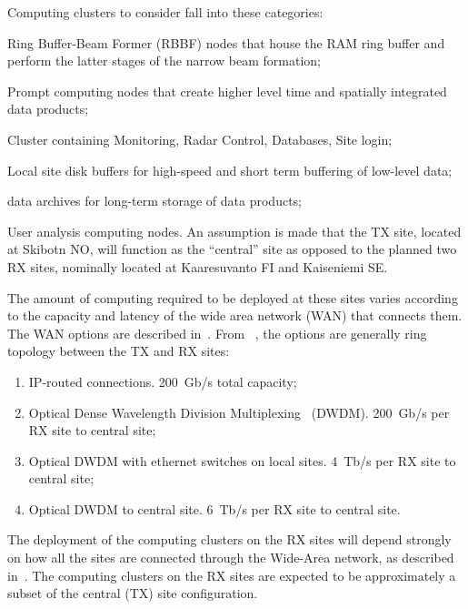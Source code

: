 \documentclass[12pt,a4paper]{article}
\begin{document}
Computing clusters to consider fall into these categories:
\bitm
\item Ring Buffer-Beam Former (RBBF) nodes that house the RAM ring buffer and perform the latter stages of the narrow beam formation;
\item Prompt computing nodes that create higher level time and spatially integrated data products;
\item Cluster containing Monitoring, Radar Control, Databases, Site login;
\item Local site disk buffers for high-speed and short term buffering of low-level data;
\item \ED data archives for long-term storage of data products;
\item User analysis computing nodes.
\eitm
An assumption is made that the TX site, located at Skibotn NO, will function as the ``central'' site as opposed to the planned two RX sites, nominally located at Kaaresuvanto FI and Kaiseniemi SE.

The amount of computing required to be deployed at these sites varies according to the capacity and latency of the wide area network (WAN) that connects them.  
The WAN options are described in~\cite{e3dds-del-1-1}.
From ~\cite{e3dds-del-1-1}, the options are generally ring topology between the TX and RX sites:
\begin{enumerate}
\item IP-routed connections. 200~Gb/s total capacity;
\item Optical Dense Wavelength Division Multiplexing~\cite{dwdm} (DWDM). 200~Gb/s per RX site to central site;
\item Optical DWDM with ethernet switches on local sites. 4~Tb/s per RX site to central site;
\item Optical DWDM to central site. 6~Tb/s per RX site to central site.
\end{enumerate}


The deployment of the computing clusters on the RX sites will depend strongly on how all the sites are connected through the Wide-Area network, as described in~\cite{e3dds-del-1-1}.
The computing clusters on the RX sites are expected to be  approximately a subset of the central (TX) site configuration.
\end{document}
